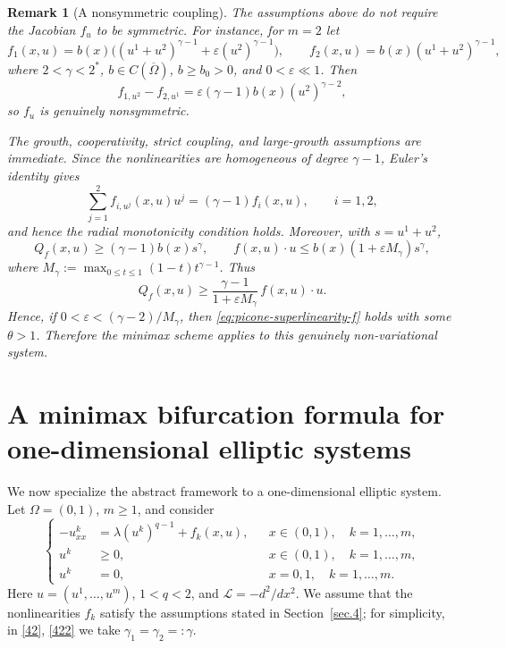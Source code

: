 \documentclass[preprint,10pt]{elsarticle}
\numberwithin{equation}{section}
\newtheorem{rem}[thm]{Remark}
\begin{document}
\begin{rem}[A nonsymmetric coupling]
	The assumptions above do not require the Jacobian \(f_u\) to be symmetric.
	For instance, for \(m=2\) let
	\[
	f_1(x,u)=b(x)\bigl((u^1+u^2)^{\gamma-1}
	+\varepsilon (u^2)^{\gamma-1}\bigr),
	\qquad
	f_2(x,u)=b(x)(u^1+u^2)^{\gamma-1},
	\]
	where \(2<\gamma<2^*\), \(b\in C(\overline\Omega)\), \(b\ge b_0>0\),
	and \(0<\varepsilon\ll1\). Then
	\[
	f_{1,u^2}-f_{2,u^1}
	=
	\varepsilon(\gamma-1)b(x)(u^2)^{\gamma-2},
	\]
	so \(f_u\) is genuinely nonsymmetric.
	
	The growth, cooperativity, strict coupling, and large-growth assumptions
	are immediate. Since the nonlinearities are homogeneous of degree
	\(\gamma-1\), Euler's identity gives
	\[
	\sum_{j=1}^2 f_{i,u^j}(x,u)u^j=(\gamma-1)f_i(x,u),
	\qquad i=1,2,
	\]
	and hence the radial monotonicity condition holds. Moreover, with
	\(s=u^1+u^2\),
	\[
	Q_f(x,u)\ge(\gamma-1)b(x)s^\gamma,
	\qquad
	f(x,u)\cdot u
	\le b(x)(1+\varepsilon M_\gamma)s^\gamma,
	\]
	where \(M_\gamma:=\max_{0\le t\le1}(1-t)t^{\gamma-1}\). Thus
	\[
	Q_f(x,u)
	\ge
	\frac{\gamma-1}{1+\varepsilon M_\gamma}\,f(x,u)\cdot u .
	\]
	Hence, if \(0<\varepsilon<(\gamma-2)/M_\gamma\), then
	\eqref{eq:picone-superlinearity-f} holds with some \(\theta>1\). Therefore
	the minimax scheme applies to this genuinely non-variational system.
\end{rem}





\section{A minimax bifurcation formula for one-dimensional elliptic systems}
\label{sec.5}

We now specialize the abstract framework to a one-dimensional elliptic
system. Let \(\Omega=(0,1)\), \(m\ge1\), and consider
\begin{equation}
	\label{fd1}
	\left\{
	\begin{aligned}
		-u^k_{xx}
		&=\lambda (u^k)^{q-1}+f_k(x,u),
		&& x\in(0,1),\quad k=1,\ldots,m,\\
		u^k&\ge0,
		&& x\in(0,1),\quad k=1,\ldots,m,\\
		u^k&=0,
		&& x=0,1,\quad k=1,\ldots,m .
	\end{aligned}
	\right.
\end{equation}
Here \(u=(u^1,\ldots,u^m)\), \(1<q<2\), and
\(\mathcal L=-d^2/dx^2\). We assume that the nonlinearities \(f_k\) satisfy
the assumptions stated in Section~\ref{sec.4}; for simplicity, in
\eqref{42}, \eqref{422} we take \(\gamma_1=\gamma_2=:\gamma\).
\end{document}
